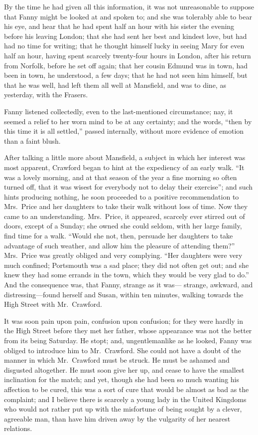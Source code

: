 \documentclass{article}
\begin{document}
By the time he had given all this information, it was not
unreasonable to suppose that Fanny might be looked at
and spoken to; and she was tolerably able to bear his eye,
and hear that he had spent half an hour with his sister
the evening before his leaving London; that she had sent
her best and kindest love, but had had no time for writing;
that he thought himself lucky in seeing Mary for even half
an hour, having spent scarcely twenty-four hours in London,
after his return from Norfolk, before he set off again;
that her cousin Edmund was in town, had been in town,
he understood, a few days; that he had not seen him himself,
but that he was well, had left them all well at Mansfield,
and was to dine, as yesterday, with the Frasers.

Fanny listened collectedly, even to the last-mentioned
circumstance; nay, it seemed a relief to her worn
mind to be at any certainty; and the words, ``then by
this time it is all settled,'' passed internally,
without more evidence of emotion than a faint blush.

After talking a little more about Mansfield, a subject
in which her interest was most apparent, Crawford began
to hint at the expediency of an early walk.  ``It was a
lovely morning, and at that season of the year a fine morning
so often turned off, that it was wisest for everybody not
to delay their exercise''; and such hints producing nothing,
he soon proceeded to a positive recommendation to Mrs.\ Price
and her daughters to take their walk without loss of time.
Now they came to an understanding.  Mrs.\ Price, it appeared,
scarcely ever stirred out of doors, except of a Sunday;
she owned she could seldom, with her large family,
find time for a walk.  ``Would she not, then, persuade her
daughters to take advantage of such weather, and allow
him the pleasure of attending them?''  Mrs.\ Price was
greatly obliged and very complying.  ``Her daughters
were very much confined; Portsmouth was a sad place;
they did not often get out; and she knew they had some
errands in the town, which they would be very glad to do.''
And the consequence was, that Fanny, strange as it was---%
strange, awkward, and distressing---found herself and Susan,
within ten minutes, walking towards the High Street
with Mr.\ Crawford.

It was soon pain upon pain, confusion upon confusion;
for they were hardly in the High Street before they met
her father, whose appearance was not the better from its
being Saturday.  He stopt; and, ungentlemanlike as he looked,
Fanny was obliged to introduce him to Mr.\ Crawford.
She could not have a doubt of the manner in which
Mr.\ Crawford must be struck.  He must be ashamed
and disgusted altogether.  He must soon give her up,
and cease to have the smallest inclination for the match;
and yet, though she had been so much wanting his affection
to be cured, this was a sort of cure that would be almost
as bad as the complaint; and I believe there is scarcely
a young lady in the United Kingdoms who would not rather
put up with the misfortune of being sought by a clever,
agreeable man, than have him driven away by the vulgarity
of her nearest relations.
\end{document}
